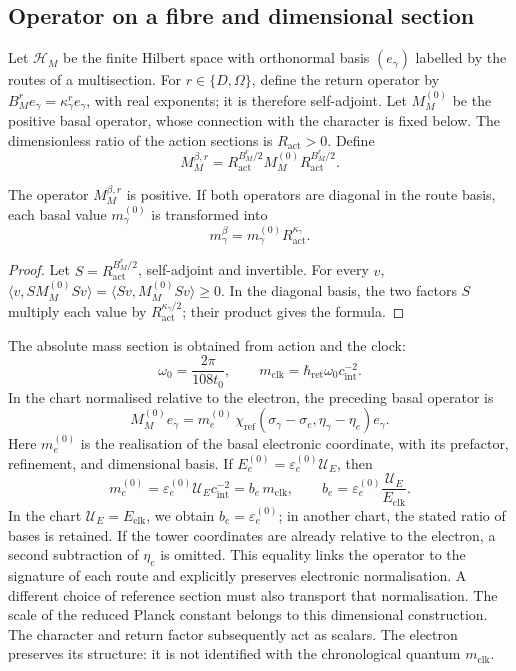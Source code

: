 \subsection{Operator on a fibre and dimensional section}

Let \(\mathscr H_M\) be the finite Hilbert space with orthonormal basis
\((e_\gamma)\) labelled by the routes of a multisection. For
\(r\in\{D,\Omega\}\), define the return operator by
\(B_M^re_\gamma=\kappa_\gamma^re_\gamma\), with real exponents;
it is therefore self-adjoint. Let \(M_M^{(0)}\) be the positive basal operator,
whose connection with the character is fixed below.
The dimensionless ratio of the
action sections is \(R_{\mathrm{act}}>0\). Define
\[
 M_M^{\beta,r}=R_{\mathrm{act}}^{B_M^r/2}
 M_M^{(0)}R_{\mathrm{act}}^{B_M^r/2}.
\]

\begin{proposition}
The operator \(M_M^{\beta,r}\) is positive. If both operators are
diagonal in the route basis, each basal value \(m_\gamma^{(0)}\)
is transformed into
\[
 m_\gamma^\beta=m_\gamma^{(0)}R_{\mathrm{act}}^{\kappa_\gamma}.
\]
\end{proposition}
\begin{proof}
Let \(S=R_{\mathrm{act}}^{B_M^r/2}\), self-adjoint and invertible.
For every \(v\),
\(\langle v,SM_M^{(0)}Sv\rangle=\langle Sv,M_M^{(0)}Sv\rangle\ge0\).
In the diagonal basis, the two factors \(S\) multiply each value
by \(R_{\mathrm{act}}^{\kappa_\gamma/2}\); their product gives the formula.
\end{proof}

The absolute mass section is obtained from action and the clock:
\[
 \omega_0=\frac{2\pi}{108t_0},\qquad
m_{\mathrm{clk}}=\hbar_{\mathrm{ret}}\omega_0c_{\mathrm{int}}^{-2}.
\]
In the chart normalised relative to the electron, the preceding basal operator is
\[
 M_M^{(0)}e_\gamma
 =m_e^{(0)}\,
   \chi_{\mathrm{ref}}(\sigma_\gamma-\sigma_e,
                       \eta_\gamma-\eta_e)e_\gamma.
\]
Here \(m_e^{(0)}\) is the realisation of the basal electronic
coordinate, with its prefactor, refinement, and dimensional basis.
If \(E_e^{(0)}=\varepsilon_e^{(0)}\mathcal U_E\), then
\[
 m_e^{(0)}=\varepsilon_e^{(0)}\mathcal U_Ec_{\mathrm{int}}^{-2}
 =b_e\,m_{\mathrm{clk}},\qquad
 b_e=\varepsilon_e^{(0)}\frac{\mathcal U_E}{E_{\mathrm{clk}}}.
\]
In the chart \(\mathcal U_E=E_{\mathrm{clk}}\), we obtain
\(b_e=\varepsilon_e^{(0)}\); in another chart, the stated ratio
of bases is retained. If the tower coordinates are already
relative to the electron, a second subtraction of \(\eta_e\) is omitted.
This equality links the operator to the signature of each route and explicitly
preserves electronic normalisation. A different choice of
reference section must also transport that normalisation.
The scale of the reduced Planck constant belongs to this dimensional
construction. The character and return factor subsequently act as
scalars. The electron preserves its structure: it is not identified with the
chronological quantum \(m_{\mathrm{clk}}\).

